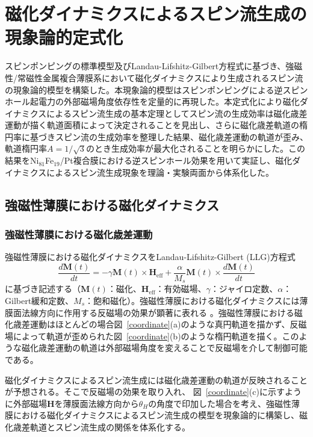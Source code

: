 
\chapter{磁化ダイナミクスによるスピン流生成の現象論的定式化}\label{formulation}


スピンポンピングの標準模型及びLandau-Lifshitz-Gilbert方程式に基づき、強磁性/常磁性金属複合薄膜系において磁化ダイナミクスにより生成されるスピン流の現象論的模型を構築した。本現象論的模型はスピンポンピングによる逆スピンホール起電力の外部磁場角度依存性を定量的に再現した。本定式化により磁化ダイナミクスによるスピン流生成の基本定理としてスピン流の生成効率は磁化歳差運動が描く軌道面積によって決定されることを見出し、さらに磁化歳差軌道の楕円率に基づきスピン流の生成効率を整理した結果、磁化歳差運動の軌道が歪み、軌道楕円率$A=1/\sqrt{3}$のとき生成効率が最大化されることを明らかにした。この結果をNi$_{81}$Fe$_{19}$/Pt複合膜における逆スピンホール効果を用いて実証し、磁化ダイナミクスによるスピン流生成現象を理論・実験両面から体系化した。


\section{強磁性薄膜における磁化ダイナミクス}
\subsection{強磁性薄膜における磁化歳差運動}
強磁性薄膜における磁化ダイナミクスをLandau-Lifshitz-Gilbert (LLG)方程式
\begin{equation}
\frac{d\bm{M}(t)}{dt}=-\gamma\bm{M}(t)\times\bm{H}_\text{eff}+\frac{\alpha}{M_s}\bm{M}(t)\times\frac{d\bm{M}(t)}{dt}\label{LLGLLG}
\end{equation}
に基づき記述する（$\bm{M}(t)$：磁化、$\bm{H}_\text{eff}$：有効磁場、$\gamma$：ジャイロ定数、$\alpha$：Gilbert緩和定数、$M_s$：飽和磁化）。強磁性薄膜における磁化ダイナミクスには薄膜面法線方向に作用する反磁場の効果が顕著に表れる
。強磁性薄膜における磁化歳差運動はほとんどの場合図~\ref{coordinate}(a)のような真円軌道を描かず、反磁場によって軌道が歪められた図~\ref{coordinate}(b)のような楕円軌道を描く。このような磁化歳差運動の軌道は外部磁場角度を変えることで反磁場を介して制御可能である。

磁化ダイナミクスによるスピン流生成には磁化歳差運動の軌道が反映されることが予想される。そこで反磁場の効果を取り入れ、
図~\ref{coordinate}(c)に示すように外部磁場$\bm{H}$を薄膜面法線方向から$\theta_H$の角度で印加した場合を考え、強磁性薄膜における磁化ダイナミクスによるスピン流生成の模型を現象論的に構築し、磁化歳差軌道とスピン流生成の関係を体系化する。

